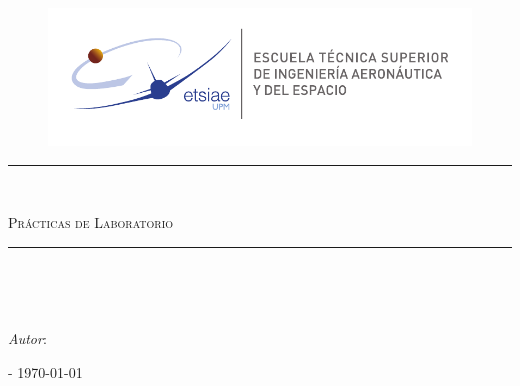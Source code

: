 \begin{titlepage}
    \begin{center}
    
        \begin{figure}[!htb]
            \centering
            \includegraphics[width = 0.9\linewidth]{include/figures/logo.pdf}
        \end{figure}
        \rule{\linewidth}{0.3mm}\\

        \vspace*{0.4cm}    
        \begin{large}
          \textsc{Prácticas de Laboratorio}
        \end{large}
    
        \vspace*{0.1cm}
        \begin{Large}
          \textbf{\Subject}
        \end{Large}
        
        \vspace*{0.1cm}
        \begin{large}
          \underline{\textsc{\Lab}}
        \end{large}

          
        \rule{\linewidth}{0.3mm}\\  

        \vspace*{1cm}
        \begin{small}
            \textbf{ \Degree } \\
            \Especiality
        \end{small}

    \vspace*{2cm}

    \textit{Autor}: \textsc{\Author}

        \vspace*{3cm}
        \begin{large}
            \textsc{\Location - \today}
		\end{large}
    \end{center}
\end{titlepage}
